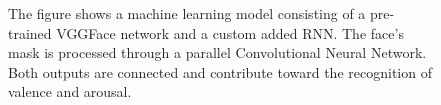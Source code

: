\begin{figure}[htbp]
  \begin{center}
  \caption[ER pipeline step \#6: Machine learning model]{The figure shows a machine learning model consisting of a pre-trained VGGFace network and a custom added RNN. The face's mask is processed through a parallel Convolutional Neural Network. Both outputs are connected and contribute toward the recognition of valence and arousal.}
  \label{fig:MachineLearningModel}
  \end{center}
\end{figure}

